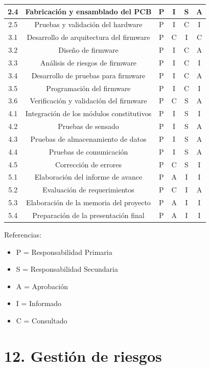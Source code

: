 \documentclass[11pt]{charter}
\begin{document}
\begin{table}[htpb]
{\begin{tabular}{|c|c|c|c|c|c|}
2.4 & Fabricación y ensamblado del PCB & P & I & S & A \\ \hline
2.5 & Pruebas y validación del hardware & P & I & C & I \\ \hline
3.1 & Desarrollo de arquitectura del firmware  & P & C & I & C \\ \hline
3.2 & Diseño de firmware & P & I & C & A \\ \hline
3.3 & Análisis de riesgos de firmware & P & I & C & I \\ \hline
3.4 & Desarrollo de pruebas para firmware & P & I & C & A \\ \hline
3.5 & Programación del firmware & P & I & C & I \\ \hline
3.6 & Verificación y validación del firmware & P & C & S & A \\ \hline
4.1 & Integración de los módulos constitutivos & P & I & S & I \\ \hline
4.2 & Pruebas de sensado & P & I & S & A \\ \hline
4.3 & Pruebas de almacenamiento de datos& P & I & S & A \\ \hline
4.4 & Pruebas de comunicación & P & I & S & A \\ \hline
4.5 & Corrección de errores & P & C & S & I \\ \hline
5.1 & Elaboración del informe de avance& P & A & I & I \\ \hline
5.2 & Evaluación de requerimientos & P & C & I & A \\ \hline
5.3 & Elaboración de la memoria del proyecto & P & A & I & I \\ \hline
5.4 & Preparación de la presentación final & P & A & I & I \\ \hline\end{tabular}%
}
\end{table}

{\footnotesize
Referencias:
\begin{itemize}
	\item P = Responsabilidad Primaria
	\item S = Responsabilidad Secundaria
	\item A = Aprobación
	\item I = Informado
	\item C = Consultado
\end{itemize}
} %


\section{12. Gestión de riesgos}
\label{sec:riesgos}
\end{document}

